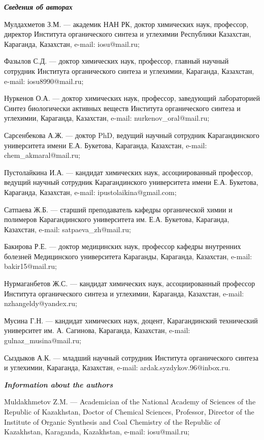 \begin{authorinfo}
\hspace{1em}\emph{{\bfseries Сведения об авторах}}  

Мулдахметов З.М. — академик НАН РК, доктор химических наук, профессор,
директор Института органического синтеза и углехимии Республики
Казахстан, Караганда, Казахстан, e-mail: iosu@mail.ru;

Фазылов С.Д. — доктор химических наук, профессор, главный научный
сотрудник Института органического синтеза и углехимии, Караганда,
Казахстан, e-mail: iosu8990@mail.ru;

Нуркенов О.А. — доктор химических наук, профессор, заведующий
лабораторией Синтез биологически активных веществ Института
органического синтеза и углехимии, Караганда, Казахстан, e-mail:
nurkenov\_oral@mail.ru;

Сарсенбекова А.Ж. — доктор PhD, ведущий научный сотрудник
Карагандинского университета имени Е.А. Букетова, Караганда,
Казахстан, e-mail: chem\_akmaral@mail.ru;

Пустолайкина И.А. — кандидат химических наук, ассоциированный
профессор, ведущий научный сотрудник Карагандинского университета
имени Е.А. Букетова, Караганда, Казахстан, e-mail:
ipustolaikina@gmail.com;

Сатпаева Ж.Б. — старший преподаватель кафедры органической химии и
полимеров Карагандинского университета им. Е.А. Букетова, Караганда,
Казахстан, e-mail: satpaeva\_zh@mail.ru;

Бакирова Р.Е. — доктор медицинских наук, профессор кафедры внутренних
болезней Медицинского университета Караганды, Караганда, Казахстан,
e-mail: bakir15@mail.ru;

Нурмаганбетов Ж.С. — кандидат химических наук, ассоциированный
профессор Института органического синтеза и углехимии, Караганда,
Казахстан, e-mail: nzhangeldy@yandex.ru;

Мусина Г.Н. — кандидат химических наук, доцент, Карагандинский
технический университет им. А. Сагинова, Караганда, Казахстан, e-mail:
gulnaz\_musina@mail.ru;

Сыздыков А.К. — младший научный сотрудник Института органического
синтеза и углехимии, Караганда, Казахстан, e-mail:
ardak.syzdykov.96@inbox.ru.

\hspace{1em}\emph{{\bfseries Information about the authors}}  

Muldakhmetov Z.M. — Academician of the National Academy of Sciences of
the Republic of Kazakhstan, Doctor of Chemical Sciences, Professor,
Director of the Institute of Organic Synthesis and Coal Chemistry of
the Republic of Kazakhstan, Karaganda, Kazakhstan, e-mail:
iosu@mail.ru;


\end{authorinfo}
